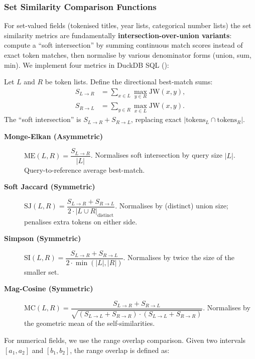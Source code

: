 \subsubsection{Set Similarity Comparison Functions}
\label{sec:set_similarities}

For set-valued fields (tokenised titles, year lists, categorical number lists) the set similarity metrics are fundamentally \textbf{intersection-over-union variants}: compute a ``soft intersection'' by summing continuous match scores instead of exact token matches, then normalise by various denominator forms (union, sum, min). We implement four metrics in DuckDB SQL ():

Let $L$ and $R$ be token lists. Define the directional best-match sums:
\begin{align}
	S_{L \to R} & = \sum_{x \in L} \max_{y \in R} \text{JW}(x,y), \\
	S_{R \to L} & = \sum_{y \in R} \max_{x \in L} \text{JW}(x,y).
\end{align}
The ``soft intersection'' is $S_{L \to R} + S_{R \to L}$, replacing exact $|\text{tokens}_L \cap \text{tokens}_R|$.

\begin{description}
	\item[\textbf{Monge-Elkan (Asymmetric)}] $\text{ME}(L,R) = \dfrac{S_{L \to R}}{|L|}$. Normalises soft intersection by query size $|L|$. Query-to-reference average best-match.

	\item[\textbf{Soft Jaccard (Symmetric)}] $\text{SJ}(L,R) = \dfrac{S_{L \to R} + S_{R \to L}}{2 \cdot |L \cup R|_{\text{distinct}}}$. Normalises by (distinct) union size; penalises extra tokens on either side.

	\item[\textbf{Simpson (Symmetric)}] $\text{SI}(L,R) = \dfrac{S_{L \to R} + S_{R \to L}}{2 \cdot \min(|L|, |R|)}$. Normalises by twice the size of the smaller set.

	\item[\textbf{Mag-Cosine (Symmetric)}] $\text{MC}(L,R) = \dfrac{S_{L \to R} + S_{R \to L}}{\sqrt{(S_{L \to L} + S_{R \to R}) \cdot (S_{L \to L} + S_{R \to R})}}$. Normalises by the geometric mean of the self-similarities.
\end{description}

For numerical fields, we use the range overlap comparison. Given two intervals $[a_1, a_2]$ and $[b_1, b_2]$, the range overlap is defined as:

